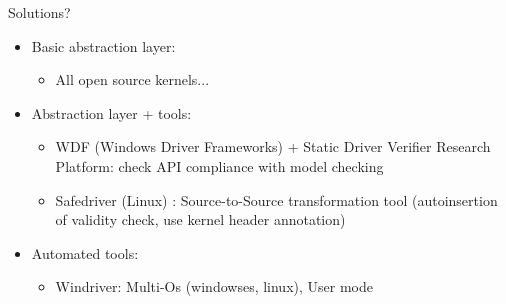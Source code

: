 \documentclass[xcolor={usenames,svgnames}]{beamer}
\begin{document}
\begin{frame}{Solutions?}
\begin{itemize}
\item Basic abstraction layer:
\begin{itemize}
\item All open source kernels...
\end{itemize}
\item Abstraction layer + tools:
\begin{itemize}
\item WDF (Windows Driver Frameworks) + Static Driver Verifier Research Platform: check API compliance with model checking
\item Safedriver (Linux) : Source-to-Source transformation tool (autoinsertion of validity check, use kernel header annotation)
\end{itemize}
\item Automated tools:
\begin{itemize}
\item Windriver: Multi-Os (windowses, linux), User mode
\end{itemize}
\end{itemize}
\end{frame}
\end{document}
